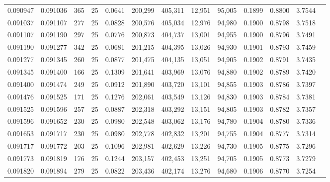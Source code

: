 \begin{tabular}{rrrrrrrrrrrrr}
0.090947 & 0.091036 &   365 &  25 &                                     0.0641 & 200,299 & 405,311 &  12,951 &  95,005 & 0.1899 & 0.8800 & 3.7544 \\
0.091037 & 0.091107 &   277 &  25 &                                     0.0828 & 200,576 & 405,034 &  12,976 &  94,980 & 0.1900 & 0.8798 & 3.7518 \\
0.091107 & 0.091190 &   297 &  25 &                                     0.0776 & 200,873 & 404,737 &  13,001 &  94,955 & 0.1900 & 0.8796 & 3.7491 \\
0.091190 & 0.091277 &   342 &  25 &                                     0.0681 & 201,215 & 404,395 &  13,026 &  94,930 & 0.1901 & 0.8793 & 3.7459 \\
0.091277 & 0.091345 &   260 &  25 &                                     0.0877 & 201,475 & 404,135 &  13,051 &  94,905 & 0.1902 & 0.8791 & 3.7435 \\
0.091345 & 0.091400 &   166 &  25 &                                     0.1309 & 201,641 & 403,969 &  13,076 &  94,880 & 0.1902 & 0.8789 & 3.7420 \\
0.091400 & 0.091474 &   249 &  25 &                                     0.0912 & 201,890 & 403,720 &  13,101 &  94,855 & 0.1903 & 0.8786 & 3.7397 \\
0.091476 & 0.091525 &   171 &  25 &                                     0.1276 & 202,061 & 403,549 &  13,126 &  94,830 & 0.1903 & 0.8784 & 3.7381 \\
0.091525 & 0.091596 &   257 &  25 &                                     0.0887 & 202,318 & 403,292 &  13,151 &  94,805 & 0.1903 & 0.8782 & 3.7357 \\
0.091596 & 0.091652 &   230 &  25 &                                     0.0980 & 202,548 & 403,062 &  13,176 &  94,780 & 0.1904 & 0.8780 & 3.7336 \\
0.091653 & 0.091717 &   230 &  25 &                                     0.0980 & 202,778 & 402,832 &  13,201 &  94,755 & 0.1904 & 0.8777 & 3.7314 \\
0.091717 & 0.091772 &   203 &  25 &                                     0.1096 & 202,981 & 402,629 &  13,226 &  94,730 & 0.1905 & 0.8775 & 3.7296 \\
0.091773 & 0.091819 &   176 &  25 &                                     0.1244 & 203,157 & 402,453 &  13,251 &  94,705 & 0.1905 & 0.8773 & 3.7279 \\
0.091820 & 0.091894 &   279 &  25 &                                     0.0822 & 203,436 & 402,174 &  13,276 &  94,680 & 0.1906 & 0.8770 & 3.7254 \\

\end{tabular}
